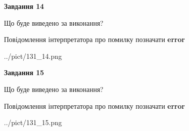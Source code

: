 \documentclass[11pt, ukrainian]{article}
\begin{document}
{\begin {large}
{\begin {center}\textbf{Завдання 14}\end {center}}\par
Що буде виведено за виконання? \par
Повідомлення інтерпретатора про помилку позначати \textbf{error}

\begin{center}
	{../pict/131_14.png}
\end{center}
\newpage

{\begin {center}\textbf{Завдання 15}\end {center}}\par
Що буде виведено за виконання? \par
Повідомлення інтерпретатора про помилку позначати \textbf{error}

\begin{center}
	{../pict/131_15.png}
\end{center}
\newpage

\end {large}}
\end{document}
